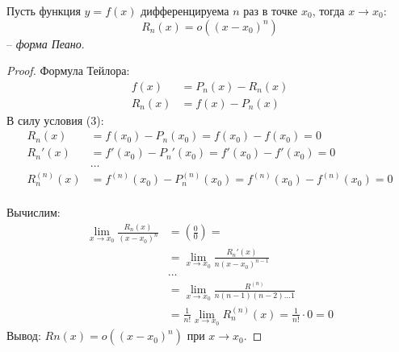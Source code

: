 \begin{theorem}
  Пусть функция $y = f(x)$ дифференцируема $n$ раз в точке $x_0$, тогда $x \to x_0$: \[
    \boxed{R_n(x) = o((x - x_0)^n)}
  \] 
  -- \textit{форма Пеано}. 
\end{theorem}
\begin{proof}
  Формула Тейлора:
  \begin{align*}
    f(x) &= P_n(x) - R_n(x) \\
    R_n(x) &= f(x) - P_n(x)
  \end{align*}
  В силу условия (3):
  \begin{align*}
    R_n(x) &= f(x_0) - P_n(x_0) = f(x_0) - f(x_0) = 0 \\
    R_n'(x) &= f'(x_0) - P_n'(x_0) = f'(x_0) - f'(x_0) = 0 \\
            &\ldots \\
    R_n^{(n)}(x) &= f^{(n)}(x_0) - P_n^{(n)}(x_0) = f^{(n)}(x_0) - f^{(n)}(x_0) = 0 \\
  \end{align*}

  Вычислим: 
  \begin{align*}
    \lim_{x \to x_0} \frac{R_n(x)}{(x - x_0)^n} &= \left( \frac{0}{0} \right) = \\
      &= \lim_{x \to x_0} \frac{R_n'(x)}{n(x - x_0)^{n-1}} \\
      &\ldots \\
      &= \lim_{x \to x_0} \frac{R^{(n)}}{n(n-1)(n-2) \ldots 1} \\
      &= \frac{1}{n!} \lim_{x \to x_0} R_n^{(n)}(x) = \frac{1}{n!} \cdot 0 = 0 
  \end{align*}
  Вывод: $Rn(x) = o((x - x_0)^n)$ при $x \to x_0$.
\end{proof}

